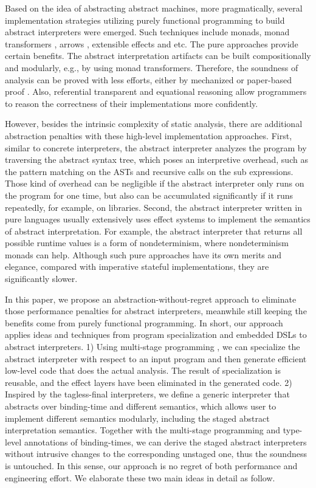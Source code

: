 Based on the idea of abstracting abstract machines, more pragmatically,
several implementation strategies utilizing purely functional programming
to build abstract interpreters were emerged. Such techniques include monads,
monad transformers \cite{DBLP:journals/pacmpl/DaraisLNH17, Sergey:2013:MAI:2491956.2491979},
arrows \cite{Keidel:2018:CSP:3243631.3236767}, extensible effects \cite{Githubsemantic} and etc.
The pure approaches provide certain benefits. The abstract interpretation
artifacts can be built compositionally and modularly, e.g., by using monad
transformers. Therefore, the soundness of analysis can be proved with less efforts,
either by mechanized \cite{Darais:2016:CGC:2951913.2951934} or paper-based proof
\cite{Keidel:2018:CSP:3243631.3236767}. Also, referential transparent and
equational reasoning allow programmers to reason the correctness of their
implementations more confidently.

However, besides the intrinsic complexity of static analysis, there are
additional abstraction penalties with these high-level implementation approaches.
First, similar to concrete interpreters, the abstract interpreter analyzes the
program by traversing the abstract syntax tree, which poses an interpretive
overhead, such as the pattern matching on the ASTs and recursive calls on the sub
expressions. Those kind of overhead can be negligible if the abstract
interpreter only runs on the program for one time, but also can be accumulated
significantly if it runs repeatedly, for example, on libraries.
Second, the abstract interpreter written in pure languages usually extensively
uses effect systems to implement the semantics of abstract interpretation.
For example, the abstract interpreter that returns all possible runtime values
is a form of nondeterminism, where nondeterminism monads can help.
Although such pure approaches have its own merits and elegance,
compared with imperative stateful implementations, they are significantly slower.

In this paper, we propose an abstraction-without-regret approach to
eliminate those performance penalties for abstract interpreters, meanwhile
still keeping the benefits come from purely functional programming.
In short, our approach applies ideas and techniques from program specialization
and embedded DSLs to abstract interpreters. 1) Using multi-stage
programming , we can specialize the abstract interpreter with respect to an
input program and then generate efficient low-level code that does the actual analysis.
The result of specialization is reusable, and the effect layers have been
eliminated in the generated code. 2) Inspired by the tagless-final interpreters,
we define a generic interpreter that abstracts over binding-time and
different semantics, which allows user to implement different semantics
modularly, including the staged abstract interpretation semantics.
Together with the multi-stage programming and type-level annotations of binding-times,
we can derive the staged abstract interpreters without intrusive changes to
the corresponding unstaged one, thus the soundness is untouched.
In this sense, our approach is no regret of both performance and engineering
effort. We elaborate these two main ideas in detail as follow.

